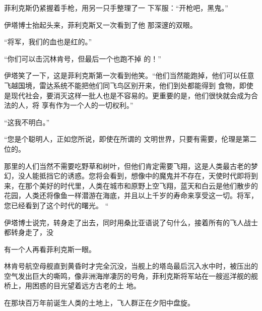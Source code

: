 \documentclass{article}
\begin{document}
菲利克斯仍紧握着手枪，用另一只手整理了一
下军服：“开枪吧，黑鬼。” 

伊塔博士抬起头来，菲利克斯又一次看到了他
那深邃的双眼。 


“将军，我们的血也是红的。” 

“你们可以击沉林肯号，但最后一个也跑不掉
的！” 

伊塔笑了一下，这是菲利克斯第一次看到他笑。“他们当然能跑掉，他们可以任意飞越国境，雷达系统不能把他们同飞鸟区别开来，他们到处都能得到
\newpage
食物，即使是现代社会，要消灭这样一批人也是不容易的。更重要的是，他们很快就会成为合法的人，将
享有作为一个人的一切权利。” 


“这我不明白。” 

“您是个聪明人，正如您所说，即使在所谓的
文明世界，只要有需要，伦理是第二位的。 

那里的人们当然不需要吃野草和树叶，但他们肯定需要飞翔，这是人类最古老的梦幻，没人能抵挡它的诱惑。您将会看到，想像中的魔鬼并不存在，天使时代即将到来，在那个美好的时代里，人类在城市和原野上空飞翔，蓝天和白云是他们散步的花园，人类还将像鱼一样潜游在海底，并且以上千岁的寿命来享受这一切。将军，您已经看到了这个时代的曙光。
“ 

伊塔博士说完，转身走了出去，同时用桑比亚语说了句什么，接着所有的飞人战士都转身走了，没

\newpage
有一个人再看菲利克斯一眼。 

林肯号航空母舰直到黄昏时才完全沉没，当舰上的塔岛最后沉入水中时，被压出的空气发出巨大的嘶鸣，像非洲海岸凄厉的号角，菲利克斯将军站在一艘巡洋舰的舰桥上，用困惑的目光望着远方古老的土
地。 

在那块百万年前诞生人类的土地上，飞人群正在夕阳中盘旋。
\end{document}
